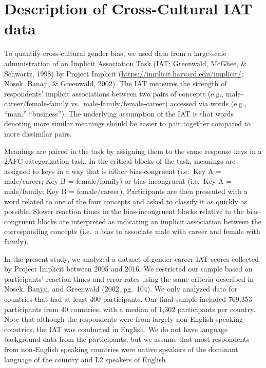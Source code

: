 \documentclass[man,floatsintext]{apa6}
\theoremstyle{definition}
\theoremstyle{definition}
\theoremstyle{definition}
\theoremstyle{remark}
\begin{document}
\section{Description of Cross-Cultural IAT
data}\label{description-of-cross-cultural-iat-data}

To quantify cross-cultural gender bias, we used data from a large-scale
administration of an Implicit Association Task (IAT; Greenwald, McGhee,
\& Schwartz, 1998) by Project Implicit
(\url{https://implicit.harvard.edu/implicit/}; Nosek, Banaji, \&
Greenwald, 2002). The IAT measures the strength of respondents' implicit
associations between two pairs of concepts (e.g.,
male-career/female-family vs.~male-family/female-career) accessed via
words (e.g., \enquote{man,} \enquote{business}). The underlying
assumption of the IAT is that words denoting more similar meanings
should be easier to pair together compared to more dissimilar pairs.

Meanings are paired in the task by assigning them to the same response
keys in a 2AFC categorization task. In the critical blocks of the task,
meanings are assigned to keys in a way that is either bias-congruent
(i.e.~Key A = male/career; Key B = female/family) or bias-incongruent
(i.e.~Key A = male/family; Key B = female/career). Participants are then
presented with a word related to one of the four concepts and asked to
classify it as quickly as possible. Slower reaction times in the
bias-incongruent blocks relative to the bias-congruent blocks are
interpreted as indicating an implicit association between the
corresponding concepts (i.e.~a bias to associate male with career and
female with family).

In the present study, we analyzed a dataset of gender-career IAT scores
collected by Project Implicit between 2005 and 2016. We restricted our
sample based on participants' reaction times and error rates using the
same criteria described in Nosek, Banjai, and Greenwald (2002, pg.~104).
We only analyzed data for countries that had at least 400 participants.
Our final sample included 769,353 participants from 40 countries, with a
median of 1,302 participants per country. Note that although the
respondents were from largely non-English speaking countries, the IAT
was conducted in English. We do not have language background data from
the participants, but we assume that most respondents from non-English
speaking countries were native speakers of the dominant language of the
country and L2 speakers of English.
\end{document}
